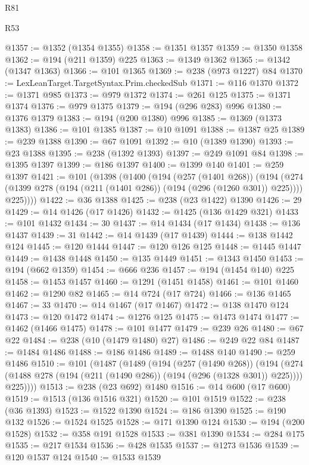 \begin{lexlean}{R81}
\begin{lexlean}{R53}
\begin{coremodule}
{{{{{{{{{{{{{{{{{{{{{{{{{{{{{{{{{{{{{{{{{{{{{{{{{{{{{{{{{{{{{{{{{{{{{{{{{{{{{{{{{{{{{{{{{{{{{{{{{{{{{{{{{{{{{{{{@1357 := @1352 (@1354 @1355)
@1358 := @1351 @1357
@1359 := @1350 @1358
@1362 := @194 (@211 @1359) @225
@1363 := @1349 @1362
@1365 := @1342 (@1347 @1363)
@1366 := @101 @1365
@1369 := @238 (@973 @1227) @84
@1370 := LexLeanTarget.TargetSyntax.Prim.checkedSub
@1371 := @116 @1370
@1372 := @1371 @985
@1373 := @979 @1372
@1374 := @261 @125
@1375 := @1371 @1374
@1376 := @979 @1375
@1379 := @194 (@296 @283) @996
@1380 := @1376 @1379
@1383 := @194 (@200 @1380) @996
@1385 := @1369 (@1373 @1383)
@1386 := @101 @1385
@1387 := @10 @1091
@1388 := @1387 @25
@1389 := @239 @1388
@1390 := @67 @1091
@1392 := @10 (@1389 @1390)
@1393 := @23 @1388
@1395 := @238 (@1392 @1393)
@1397 := @249 @1091 @84
@1398 := @1395 @1397
@1399 := @186 @1397
@1400 := @1399 @140
@1401 := @259 @1397
@1421 := @101
    (@1398
      (@1400
        (@194
          (@257 (@1401 @268))
          (@194
            (@274 (@1399 @278 (@194 (@211 (@1401 @286)) (@194 (@296 (@1260 @301)) @225))))
            @225))))
@1422 := @36 @1388
@1425 := @238 (@23 @1422) @1390
@1426 := 29
@1429 := @14 @1426 (@17 @1426)
@1432 := @1425 (@136 @1429 @321)
@1433 := @101 @1432
@1434 := 30
@1437 := @14 @1434 (@17 @1434)
@1438 := @136 @1437
@1439 := 31
@1442 := @14 @1439 (@17 @1439)
@1444 := @138 @1442 @124
@1445 := @120 @1444
@1447 := @120 @126 @125
@1448 := @1445 @1447
@1449 := @1438 @1448
@1450 := @135 @1449
@1451 := @1343 @1450
@1453 := @194 (@662 @1359)
@1454 := @666 @236
@1457 := @194 (@1454 @140) @225
@1458 := @1453 @1457
@1460 := @1291 (@1451 @1458)
@1461 := @101 @1460
@1462 := @1290 @82
@1465 := @14 @724 (@17 @724)
@1466 := @136 @1465
@1467 := 33
@1470 := @14 @1467 (@17 @1467)
@1472 := @138 @1470 @124
@1473 := @120 @1472
@1474 := @1276 @125
@1475 := @1473 @1474
@1477 := @1462 (@1466 @1475)
@1478 := @101 @1477
@1479 := @239 @26
@1480 := @67 @22
@1484 := @238 (@10 (@1479 @1480) @27)
@1486 := @249 @22 @84
@1487 := @1484 @1486
@1488 := @186 @1486
@1489 := @1488 @140
@1490 := @259 @1486
@1510 := @101
    (@1487
      (@1489
        (@194
          (@257 (@1490 @268))
          (@194
            (@274 (@1488 @278 (@194 (@211 (@1490 @286)) (@194 (@296 (@1328 @301)) @225))))
            @225))))
@1513 := @238 (@23 @692) @1480
@1516 := @14 @600 (@17 @600)
@1519 := @1513 (@136 @1516 @321)
@1520 := @101 @1519
@1522 := @238 (@36 @1393)
@1523 := @1522 @1390
@1524 := @186 @1390
@1525 := @190 @132
@1526 := @1524 @1525
@1528 := @171 @1390 @124
@1530 := @194 (@200 @1528)
@1532 := @358 @191 @1528
@1533 := @381 @1390
@1534 := @284 @175
@1535 := @217 @1534
@1536 := @428 @1535
@1537 := @1273 @1536
@1539 := @120 @1537 @124
@1540 := @1533 @1539
}}}}}}}}}}}}}}}}}}}}}}}}}}}}}}}}}}}}}}}}}}}}}}}}}}}}}}}}}}}}}}}}}}}}}}}}}}}}}}}}}}}}}}}}}}}}}}}}}}}}}}}}}}}}}}}}
\end{coremodule}
\end{lexlean}
\end{lexlean}
